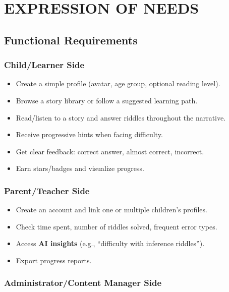 \documentclass[12pt,a4paper]{article}
\begin{document}
\section{EXPRESSION OF NEEDS}

\subsection{Functional Requirements}

\subsubsection{Child/Learner Side}

\begin{itemize}
    \item Create a simple profile (avatar, age group, optional reading level).
    \item Browse a story library or follow a suggested learning path.
    \item Read/listen to a story and answer riddles throughout the narrative.
    \item Receive progressive hints when facing difficulty.
    \item Get clear feedback: correct answer, almost correct, incorrect.
    \item Earn stars/badges and visualize progress.
\end{itemize}

\subsubsection{Parent/Teacher Side}

\begin{itemize}
    \item Create an account and link one or multiple children's profiles.
    \item Check time spent, number of riddles solved, frequent error types.
    \item Access \textbf{AI insights} (e.g., ``difficulty with inference riddles'').
    \item Export progress reports.
\end{itemize}

\subsubsection{Administrator/Content Manager Side}
\end{document}
